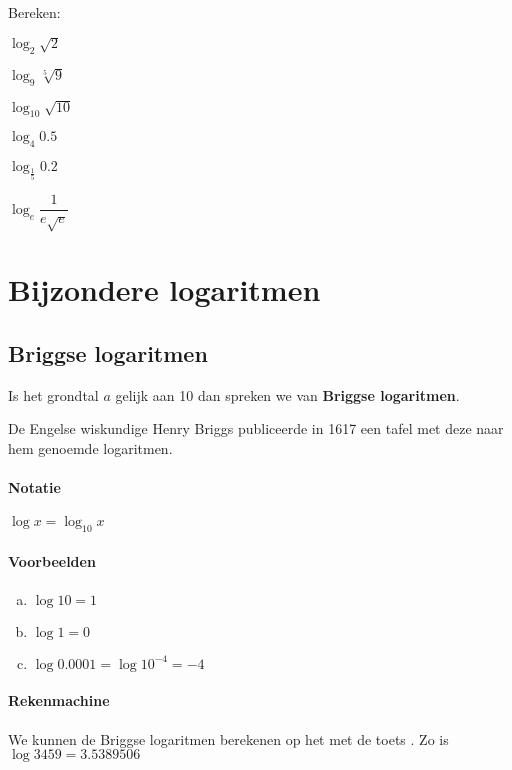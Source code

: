 \documentclass[12pt,twoside,a4paper]{article}
\begin{document}
\begin{oefening}
Bereken:
\begin{exlist}{2}
  \item $\log_2 \sqrt{2}$
  \item $\log_9 \sqrt[5]{9}$
  \item $\log_{10} \sqrt{10}$
  \item $\log_4 0.5$
  \item $\log_{\frac{1}{5}} 0.2$
  \item $\log_e \dfrac{1}{e\sqrt{e}}$
\end{exlist}
\end{oefening}

\cleardoublepage
\section{Bijzondere logaritmen}

\subsection{Briggse logaritmen}

Is het grondtal $a$ gelijk aan 10 dan spreken we van {\bf Briggse logaritmen}.

De Engelse wiskundige Henry Briggs publiceerde in 1617 een tafel met deze naar hem genoemde logaritmen.

\paragraph{Notatie} $\log x = \log_{10} x$

\paragraph{Voorbeelden}\begin{minipage}[t]{\textwidth}
\begin{enumerate}[(a)]
  \item $\log 10 = 1$
  \item $\log 1 = 0$
  \item $\log 0.0001 = \log 10^{-4} = -4$
\end{enumerate}
\end{minipage}

\paragraph{Rekenmachine} We kunnen de Briggse logaritmen berekenen op het  met de toets . Zo is $\log 3459 = 3.5389506$
\end{document}
